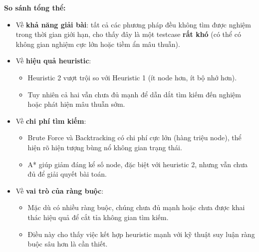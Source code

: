 \textbf{So sánh tổng thể:}

\begin{itemize}
    \item Về \textbf{khả năng giải bài}: tất cả các phương pháp đều không tìm được nghiệm trong thời gian giới hạn, cho thấy đây là một testcase \textbf{rất khó} (có thể có không gian nghiệm cực lớn hoặc tiềm ẩn mâu thuẫn).

    \item Về \textbf{hiệu quả heuristic}:
    \begin{itemize}
        \item Heuristic 2 vượt trội so với Heuristic 1 (ít node hơn, ít bộ nhớ hơn).
        \item Tuy nhiên cả hai vẫn chưa đủ mạnh để dẫn dắt tìm kiếm đến nghiệm hoặc phát hiện mâu thuẫn sớm.
    \end{itemize}

    \item Về \textbf{chi phí tìm kiếm}:
    \begin{itemize}
        \item Brute Force và Backtracking có chi phí cực lớn (hàng triệu node), thể hiện rõ hiện tượng bùng nổ không gian trạng thái.
        \item A* giúp giảm đáng kể số node, đặc biệt với heuristic 2, nhưng vẫn chưa đủ để giải quyết bài toán.
    \end{itemize}

    \item Về \textbf{vai trò của ràng buộc}:
    \begin{itemize}
        \item Mặc dù có nhiều ràng buộc, chúng chưa đủ mạnh hoặc chưa được khai thác hiệu quả để cắt tỉa không gian tìm kiếm.
        \item Điều này cho thấy việc kết hợp heuristic mạnh với kỹ thuật suy luận ràng buộc sâu hơn là cần thiết.
    \end{itemize}

\end{itemize}
